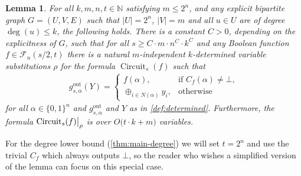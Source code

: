 \documentclass[10pt,a4paper]{article}
\theoremstyle{plain}
\newtheorem{lemma}[theorem]{Lemma}
\theoremstyle{remark}
\theoremstyle{definition}
\newcommand{\pa}[1]{}
\newcommand{\kr}[1]{}
\newcommand{\set}[1]{\{#1\}}
\newcommand\restrict[2]{{%
  \left.\kern-\nulldelimiterspace %
  #1 %
  \vphantom{\big|} %
  \right|_{#2} %
  }}
\newcommand{\calF}{\mathcal{F}}
\newcommand{\N}{\mathbb{N}}
\newcommand{\gout}{g^\mathrm{out}}
\DeclareMathOperator{\circuit}{Circuit}
\begin{document}
\begin{lemma}
  \label{lem:restriction}
  For all $k, m, n, t \in \N$ satisfying $m \le 2^n$, and any explicit
  bipartite graph $G = (U, V, E)$ such that $|U| = 2^n$, $|V| = m$ and
  all $u \in U$ are of degree $\deg(u) \le k$, the following holds.
  There is a constant $C > 0$, depending on the explicitness of $G$,
  such that for all $s \ge C \cdot m \cdot n^C\cdot k^C$ and any
  Boolean function $f \in \calF_n(s/2,t)$ there is a natural
  $m$-independent $k$-determined variable substitutions $\rho$ for the
  formula $\circuit_s(f)$ such that
  \begin{align*}
    \gout_{s, \alpha}(Y) =
    \begin{cases}
      f(\alpha), &\text{if~} C_f(\alpha) \neq \bot,\\
      \oplus_{i \in N(\alpha)} y_i, &\text{otherwise}
    \end{cases}
  \end{align*}
  for all $\alpha \in \set{0,1}^n$ and $\gout_{s, \alpha}$ and $Y$
  as in \cref{def:determined}.  Furthermore, the formula $\restrict{\circuit_s(f)}{\rho}$ is over
  $O\big(t \cdot k + m\big)$ variables.
\end{lemma}


For the degree lower bound (\cref{thm:main-degree}) we will set $t =
2^n$ and use the trivial $C_f$ which always outputs $\bot$, so the
reader who wishes a simplified version of the lemma can focus on this
special case.
\end{document}
